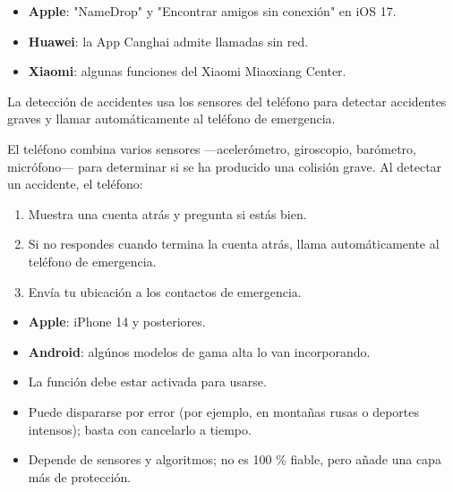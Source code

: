 
\begin{itemize}
  \item \textbf{Apple}: "NameDrop" y "Encontrar amigos sin conexión" en iOS 17.
  \item \textbf{Huawei}: la App Canghai admite llamadas sin red.
  \item \textbf{Xiaomi}: algunas funciones del Xiaomi Miaoxiang Center.
\end{itemize}


La detección de accidentes usa los sensores del teléfono para detectar accidentes graves y llamar automáticamente al teléfono de emergencia.


El teléfono combina varios sensores —acelerómetro, giroscopio, barómetro, micrófono— para determinar si se ha producido una colisión grave. Al detectar un accidente, el teléfono:

\begin{enumerate}
  \item Muestra una cuenta atrás y pregunta si estás bien.
  \item Si no respondes cuando termina la cuenta atrás, llama automáticamente al teléfono de emergencia.
  \item Envía tu ubicación a los contactos de emergencia.
\end{enumerate}


\begin{itemize}
  \item \textbf{Apple}: iPhone 14 y posteriores.
  \item \textbf{Android}: algúnos modelos de gama alta lo van incorporando.
\end{itemize}


\begin{itemize}
  \item La función debe estar activada para usarse.
  \item Puede dispararse por error (por ejemplo, en montañas rusas o deportes intensos); basta con cancelarlo a tiempo.
  \item Depende de sensores y algoritmos; no es 100 \% fiable, pero añade una capa más de protección.
\end{itemize}

